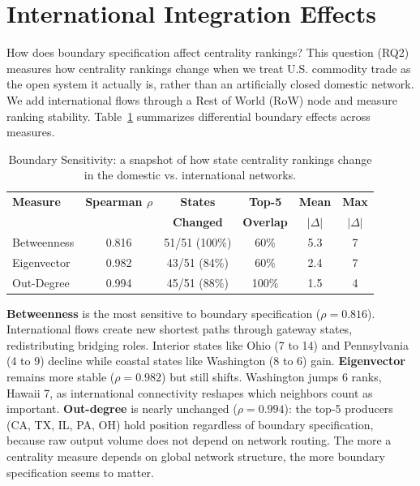 \documentclass[12pt,oneside]{book}
\begin{document}
\clearpage
\section{International Integration Effects}
\label{sec:international}

How does boundary specification affect centrality rankings? This question (RQ2) measures how centrality rankings change when we treat U.S. commodity trade as the open system it actually is, rather than an artificially closed domestic network. We add international flows through a Rest of World (RoW) node and measure ranking stability. Table~\ref{tab:boundary_effects} summarizes differential boundary effects across measures.

\begin{table}[ht]
\centering
\caption{Boundary Sensitivity: a snapshot of how state centrality rankings change in the domestic vs. international networks.}
\label{tab:boundary_effects}
\begin{tabular}{lccccc}
\hline
\textbf{Measure} & \textbf{Spearman $\rho$} & \textbf{States} & \textbf{Top-5} & \textbf{Mean} & \textbf{Max} \\
                 &                          & \textbf{Changed} & \textbf{Overlap} & \textbf{$|\Delta|$} & \textbf{$|\Delta|$} \\
\hline
Betweenness   & 0.816 & 51/51 (100\%) & 60\%  & 5.3 & 7 \\
Eigenvector   & 0.982 & 43/51 (84\%) & 60\%  & 2.4 & 7 \\
Out-Degree    & 0.994 & 45/51 (88\%) & 100\% & 1.5 & 4 \\
\hline
\end{tabular}
\end{table}

\textbf{Betweenness} is the most sensitive to boundary specification ($\rho = 0.816$). International flows create new shortest paths through gateway states, redistributing bridging roles. Interior states like Ohio (7 to 14) and Pennsylvania (4 to 9) decline while coastal states like Washington (8 to 6) gain. \textbf{Eigenvector} remains more stable ($\rho = 0.982$) but still shifts. Washington jumps 6 ranks, Hawaii 7, as international connectivity reshapes which neighbors count as important. \textbf{Out-degree} is nearly unchanged
($\rho = 0.994$): the top-5 producers (CA, TX, IL, PA, OH) hold position regardless of boundary specification, because raw output volume does not depend on network routing. The more a centrality measure depends on global network structure, the more boundary specification seems to matter. 
\end{document}
